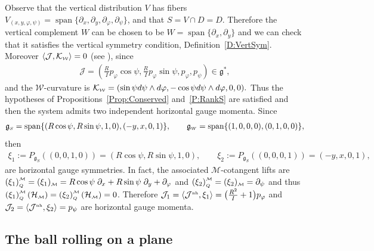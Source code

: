 \documentclass[10pt,a4paper]{amsart}
\numberwithin{equation}{section}
\def\W{\mathcal{W}}
\def\M{\mathcal{M}}
\def\J{\mathcal{J}}
\def\Ham{\mathcal{H}}
\def\g{\mathfrak{g}}
\def\nh{{\mbox{\tiny{nh}}}}
\def\subW{{\mbox{\tiny{$\W$}}}}
\def\subM{{\mbox{\tiny{$\M$}}}}
\def\subSS{{\mbox{\tiny{$S$}}}}
\def\subWW{{\mbox{\tiny{$W$}}}}
\def\subQQ{{\mbox{\tiny{$Q$}}}}
\begin{document}
Observe that the vertical distribution $V$ has f\/ibers $V_{(x,y,\varphi,\psi)} = \operatorname{span} \{ \partial_x,\partial_y,
\partial_\varphi,\partial_\psi \}$, and that $S = V\cap D = D$.
Therefore the vertical complement $W$ can be chosen to be $W=\operatorname{span}\{ \partial_x, \partial_y\}$ and we can check that it satisf\/ies the vertical symmetry condition, Def\/inition~\ref{D:VertSym}. Moreover $\langle \J, \mathcal{K}_\subW \rangle = 0$ (see \cite{Paula}), since
\begin{gather*}
\J = \left(\frac{R}{I} p_\varphi \cos\psi , \frac{R}{I} p_\varphi \sin\psi,p_\varphi,p_\psi \right)  \in \g^*,
\end{gather*}
and the $\W$-curvature is $\mathcal{K}_\subW =(\sin \psi   d\psi \wedge d\varphi
  , -\cos \psi   d\psi \wedge d\varphi   , 0, 0 ).$
Thus the hypotheses of Propositions~\ref{Prop:Conserved} and~\ref{P:RankS} are satisf\/ied and then the system admits two independent horizontal gauge
momenta.
Since
\begin{gather*}
\g_\subSS = \operatorname{span} \{(R\cos\psi,R\sin\psi,1,0),  (-y,x,0,1)\}, \qquad   \g_\subWW = \operatorname{span} \{(1,0,0,0),  (0,1,0,0)\},
\end{gather*} then
\begin{gather*}
     \xi_1 := P_{\g_S} ((0,0,1,0)) = (R\cos\psi,R\sin\psi,1,0), \qquad
     \xi_2 := P_{\g_S} ((0,0,0,1)) = (-y,x,0,1),
 \end{gather*}
are horizontal gauge symmetries.
In fact, the associated $\M$-cotangent lifts are
$\left(\xi_1\right)_\subQQ^\subM = (\xi_1)_\subM = R\cos\psi \; \partial_x+ R\sin\psi \; \partial_y + \partial_\varphi$
and $\left(\xi_2\right)_\subQQ^\subM = (\xi_2)_\subM =  \partial_\psi$ and thus $\left(\xi_1\right)_\subQQ^\subM (\Ham_\subM) = \left(\xi_2\right)_\subQQ^\subM (\Ham_\subM) = 0$.
Therefore $\J_1 =  \langle \J^{\nh},\xi_1\rangle = \big(\frac{R^2}{I}+1\big)  p_\varphi$
and $\J_2 =  \langle \J^{\nh}, \xi_2\rangle = p_\psi$ are
horizontal gauge momenta.

\subsection{The ball rolling on a plane}\label{Ex:Ball}
\end{document}

